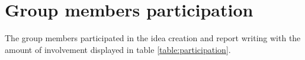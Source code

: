 \section{Group members participation}

The group members participated in the idea creation and report writing with the amount of involvement displayed in table \ref{table:participation}.

\begin{table}[ht!]
\centering
{}
\caption{Work repartition}
\label{table:participation}
\end{table}
